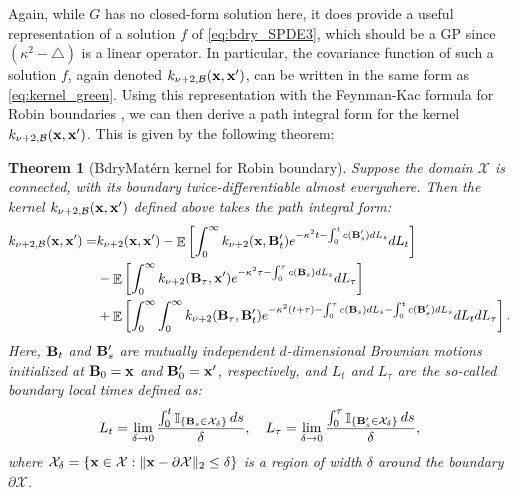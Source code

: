 \documentclass[aos,preprint]{imsart}
\theoremstyle{plain}
\newtheorem{theorem}{Theorem}[section]
\DeclareMathOperator{\E}{\mathbb E}
\DeclareMathOperator{\ind}{\mathbb I}
\newcommand{\CalX}{\mathcal X}
\newcommand{\Bx}{\bold x}
\newcommand{\BFx}{\bold x}
\theoremstyle{remark}
\begin{document}
Again, while $G$ has no closed-form solution here, it does provide a useful representation of a solution $f$ of \eqref{eq:bdry_SPDE3}, which should be a GP since $(\kappa^2 - \bigtriangleup)$ is a linear operator. In particular, the covariance function of such a solution $f$, again denoted $k_{\nu+2,\mathcal{B}}(\BFx, \BFx')$, can be written in the same form as \eqref{eq:kernel_green}. Using this representation with the Feynman-Kac formula for Robin boundaries \citep{ito1957fundamental,stroock1971diffusion,papanicolaou1990probabilistic}, we can then derive a path integral form for the kernel $k_{\nu+2,\mathcal{B}}(\BFx, \BFx')$. This is given by the following theorem:
\begin{theorem}[BdryMat\'ern kernel for Robin boundary]
\label{thm:bdryMatern_path_integral_robin}
    Suppose the domain $\CalX$ is connected, with its boundary twice-differentiable almost everywhere. Then the kernel $k_{\nu+2,\mathcal{B}}(\BFx, \BFx')$ defined above takes the path integral form:
    \begin{align}
    \begin{split}
        k_{\nu+2,\mathcal{B}}(\BFx,\BFx')
        =  &k_{\nu+2}(\BFx,\BFx')-\E\left[\int_0^{\infty} k_{\nu+2}(\BFx,\bold{B}'_{t})e^{-\kappa^2t-\int_0^tc(\bold{B}'_{s})dL_s}dL_t\right]\\
        &-\E\left[\int_0^{\infty} k_{\nu+2}(\bold{B}_{\tau},\BFx')e^{-\kappa^2\tau-\int_0^\tau c(\bold{B}_{s})dL_s}dL_\tau\right]\\
        &+\E\left[\int_0^{\infty}\int_0^{\infty} k_{\nu+2}(\bold{B}_{\tau},\bold{B}'_{t})e^{-\kappa^2(t+\tau)-\int_0^\tau c(\bold{B}_{s})dL_s-\int_0^tc(\bold{B}'_{s})dL_s}dL_tdL_\tau\right].
        \end{split}
        \label{eq:bdryMatern_path_integral_robin}
    \end{align}
    Here, $\bold{B}_t$ and $\bold{B}_s'$ are mutually independent $d$-dimensional Brownian motions initialized at $\bold{B}_0=\Bx$ and $\bold{B}'_0=\Bx'$, respectively, and $L_t$ and $L_\tau$ are the so-called boundary local times defined as:
    \begin{equation}
    L_t=\lim_{\delta\to 0}\frac{\int_0^t\ind_{\{\bold{B}_s\in\CalX_\delta\}}ds}{\delta},\quad L_\tau =\lim_{\delta\to 0}\frac{\int_0^\tau \ind_{\{\bold{B}'_s\in\CalX_\delta\}}ds}{\delta},
        \label{eq:local}
    \end{equation}
    where $\CalX_\delta = \{\BFx\in\CalX: \|\BFx-\partial\CalX\|_2 \leq\delta\}$ is a region of width $\delta$ around the boundary $\partial\CalX$.
\end{theorem}
\end{document}

